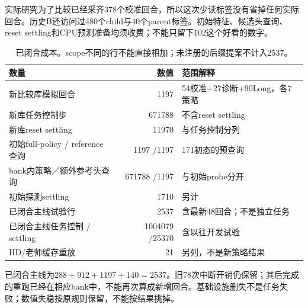 \documentclass[UTF8,a4paper,fontset=none,zihao=-4]{ctexart}
\begin{document}
实际研究为了比较已经采齐378个校准回合，所以这次少读标签没有省掉任何实际回合。历史B还访问过480个child与40个parent标签。初始特征、候选头查询、reset settling和CPU预测准备均须收费；不能只留下102这个好看的数字。
\par
\begin{table}[htbp]\centering\small
\noindent\begin{tabularx}{\textwidth}{Yrp{45mm}}\toprule
数量 & 数值 & 范围解释\\\midrule
新比较库模拟回合 &1197&54校准+27诊断+90Long，各7策略\\
新库任务控制步 &671788&不含reset settling\\
新库reset settling &11970&与任务控制分列\\
初始full-policy / reference查询 &1197 /1197&171初态的预查询\\
bank内策略／额外参考头查询 &671788 /1197&与初始probe分开\\
初始探测settling &1710&另计\\
已闭合主线试验行 &2537&含最新48回合；不是独立任务\\
已闭合主线任务控制 / settling &1004079 /25370&含以往开发试验\\
HD/老师缓存重放 &21&另列，不是新策略结果\\\bottomrule
\end{tabularx}
\caption{已闭合成本。scope不同的行不能直接相加；未注册的后缀提案不计入2537。}
\end{table}
\par
已闭合主线为$288+912+1197+140=2537$。旧78次中断开销仍保留；其后完成的重跑已经在相应bank中，不能再次算成新增回合。基础设施删失不是任务失败；数值失稳按原规则保留，不能按结果挑掉。
\end{document}
